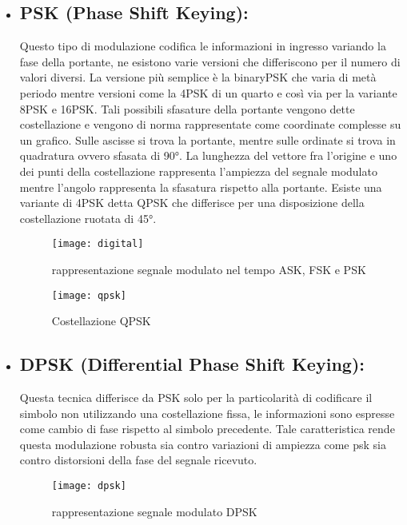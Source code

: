 \begin{itemize}
  \item \subsection{PSK (Phase Shift Keying): } Questo tipo di modulazione codifica le informazioni in ingresso variando la fase della portante, ne esistono varie versioni che differiscono per il numero di valori diversi. La versione più semplice è la binaryPSK che varia di metà periodo mentre versioni come la 4PSK di un quarto e così via per la variante 8PSK e 16PSK. Tali possibili sfasature della portante vengono dette costellazione e vengono di norma rappresentate come coordinate complesse su un grafico. Sulle ascisse si trova la portante, mentre sulle ordinate si trova in quadratura ovvero sfasata di 90°. La lunghezza del vettore fra l'origine e uno dei punti della costellazione rappresenta l'ampiezza del segnale modulato mentre l'angolo rappresenta la sfasatura rispetto alla portante. Esiste una variante di 4PSK detta QPSK che differisce per una disposizione della costellazione ruotata di 45°.
  \begin{figure}[h!]
  	\begin{minipage}[b]{.6\columnwidth}
  		\centering
  		\texttt{[image: digital]}
  		\caption{rappresentazione segnale modulato nel tempo ASK, FSK e PSK \cite{digit}}\label{fig:1}
  	\end{minipage}\hfill
  	\begin{minipage}[b]{.35\columnwidth}
  		\texttt{[image: qpsk]}
  		\caption{Costellazione QPSK \cite{qpsk}}\label{fig:1}
  	\end{minipage}\hfill
  \end{figure}
  \item \subsection{DPSK (Differential Phase Shift Keying): } Questa tecnica differisce da PSK solo per la particolarità di codificare il simbolo non utilizzando una costellazione fissa, le informazioni sono espresse come cambio di fase rispetto al simbolo precedente. Tale caratteristica rende questa modulazione robusta sia contro variazioni di ampiezza come psk sia contro distorsioni della fase del segnale ricevuto.
  \begin{figure}[h]
  	\centering
  	\texttt{[image: dpsk]}
  	\caption{rappresentazione segnale modulato DPSK \cite{dpsk}}\label{fig:1}
  \end{figure}
    

\end{itemize}
